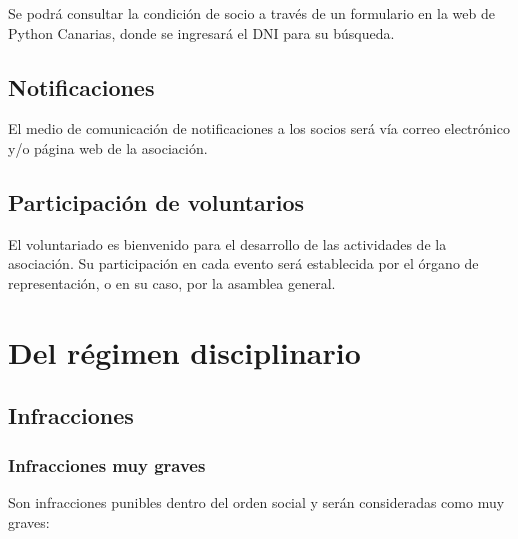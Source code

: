\documentclass[a4paper, 12pt, oneside]{book}
\begin{document}
Se podrá consultar la condición de socio a través de un formulario en la web de Python Canarias, donde se ingresará el DNI para su búsqueda.

\section{Notificaciones}

El medio de comunicación de notificaciones a los socios será vía correo electrónico y/o página web de la asociación.

\section{Participación de voluntarios}

El voluntariado es bienvenido para el desarrollo de las actividades de la asociación. Su participación en cada evento será establecida por el órgano de representación, o en su caso, por la asamblea general.

\chapter{Del régimen disciplinario}

\section{Infracciones}

\subsection{Infracciones muy graves}

Son infracciones punibles dentro del orden social y serán consideradas como muy graves:
\end{document}
